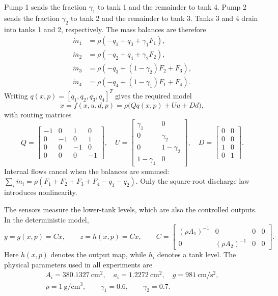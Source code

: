Pump 1 sends the fraction $\gamma_1$ to tank 1 and the remainder to
tank 4. Pump 2 sends the fraction $\gamma_2$ to tank 2 and the remainder
to tank 3. Tanks 3 and 4 drain into tanks 1 and 2, respectively.
The mass balances are therefore
\begin{align}
 \dot m_1&=\rho(-q_1+q_3+\gamma_1F_1),\\
 \dot m_2&=\rho(-q_2+q_4+\gamma_2F_2),\\
 \dot m_3&=\rho(-q_3+(1-\gamma_2)F_2+F_3),\\
 \dot m_4&=\rho(-q_4+(1-\gamma_1)F_1+F_4).
 \label{eq:p2-balances}
\end{align}
Writing $q(x,p)=[q_1,q_2,q_3,q_4]^T$ gives the required model
\begin{equation}
 \dot x=f(x,u,d,p)=\rho\bigl(Qq(x,p)+Uu+Dd\bigr),
 \label{eq:p2-drift}
\end{equation}
with routing matrices
\begin{equation}
 Q=\begin{bmatrix}-1&0&1&0\\0&-1&0&1\\0&0&-1&0\\0&0&0&-1\end{bmatrix},
 \quad U=\begin{bmatrix}\gamma_1&0\\0&\gamma_2\\0&1-\gamma_2\\1-\gamma_1&0\end{bmatrix},
 \quad D=\begin{bmatrix}0&0\\0&0\\1&0\\0&1\end{bmatrix}.
\end{equation}
Internal flows cancel when the balances are summed:
$\sum_i\dot m_i=\rho(F_1+F_2+F_3+F_4-q_1-q_2)$.
Only the square-root discharge law introduces nonlinearity.

The sensors measure the lower-tank levels, which are also the controlled
outputs. In the deterministic model,
\begin{equation}
 y=g(x,p)=Cx,\qquad z=h(x,p)=Cx,\qquad
 C=\begin{bmatrix}(\rho A_1)^{-1}&0&0&0\\0&(\rho A_2)^{-1}&0&0\end{bmatrix}.
 \label{eq:p2-output}
\end{equation}
Here $h(x,p)$ denotes the output map, while $h_i$ denotes a tank level.
The physical parameters used in all experiments are
\begin{equation}
\begin{gathered}
 A_i=380.1327\ \mathrm{cm^2},\quad a_i=1.2272\ \mathrm{cm^2},\quad
 g=981\ \mathrm{cm/s^2},\\
 \rho=1\ \mathrm{g/cm^3},\qquad \gamma_1=0.6,\qquad\gamma_2=0.7.
\end{gathered}
\end{equation}

